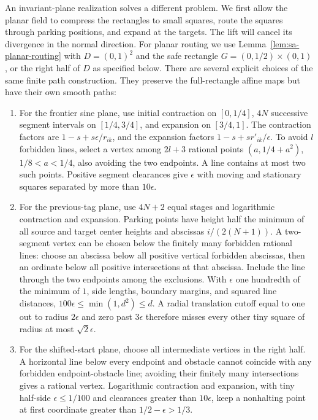 An invariant-plane realization solves a different problem. We first
allow the planar field to compress the rectangles to small squares,
route the squares through parking positions, and expand at the targets.
The lift will cancel its divergence in the normal direction.
For planar routing we use Lemma~\ref{lem:sa-planar-routing} with $D=(0,1)^2$ and the safe rectangle $G=(0,1/2)\times(0,1)$, or the right half of $D$ as specified below.  There are several explicit choices of the same finite path construction.  They preserve the full-rectangle affine maps but have their own smooth paths:
\begin{enumerate}
\item For the frontier sine plane, use initial contraction on $[0,1/4]$, $4N$ successive segment intervals on $[1/4,3/4]$, and expansion on $[3/4,1]$.  The contraction factors are $1-s+s\epsilon/r_{ik}$, and the expansion factors $1-s+sr'_{ik}/\epsilon$.  To avoid $l$ forbidden lines, select a vertex among $2l+3$ rational points $(a,1/4+a^2)$, $1/8<a<1/4$, also avoiding the two endpoints.  A line contains at most two such points.  Positive segment clearances give $\epsilon$ with moving and stationary squares separated by more than $10\epsilon$.
\item For the previous-tag plane, use $4N+2$ equal stages and logarithmic contraction and expansion.  Parking points have height half the minimum of all source and target center heights and abscissas $i/(2(N+1))$.  A two-segment vertex can be chosen below the finitely many forbidden rational lines: choose an abscissa below all positive vertical forbidden abscissas, then an ordinate below all positive intersections at that abscissa.  Include the line through the two endpoints among the exclusions.  With $\epsilon$ one hundredth of the minimum of $1$, side lengths, boundary margins, and squared line distances, $100\epsilon\le\min(1,d^2)\le d$.  A radial translation cutoff equal to one out to radius $2\epsilon$ and zero past $3\epsilon$ therefore misses every other tiny square of radius at most $\sqrt2\epsilon$.
\item For the shifted-start plane, choose all intermediate vertices in the right half.  A horizontal line below every endpoint and obstacle cannot coincide with any forbidden endpoint-obstacle line; avoiding their finitely many intersections gives a rational vertex.  Logarithmic contraction and expansion, with tiny half-side $\epsilon\le1/100$ and clearances greater than $10\epsilon$, keep a nonhalting point at first coordinate greater than $1/2-\epsilon>1/3$.

\end{enumerate}
